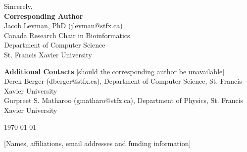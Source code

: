 \documentclass{article}
\begin{document}
Sincerely,\\ \textbf{Corresponding Author}\\
Jacob Levman, PhD (jlevman@stfx.ca) \\
Canada Research Chair in Bioinformatics \\
Department of Computer Science \\
St. Francis Xavier University

\textbf{Additional Contacts} [should the corresponding author be unavailable]\\
Derek Berger (dberger@stfx.ca), Department of Computer Science, St. Francis Xavier University\\
Gurpreet S. Matharoo (gmatharo@stfx.ca), Department of Physics, St. Francis Xavier University

\today{}

[Names, affiliations, email addresses and funding information]

\end{document}
